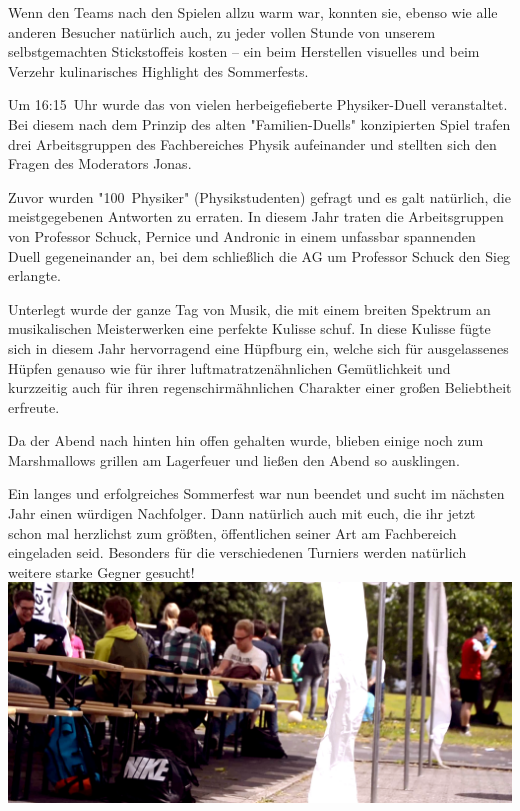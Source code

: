\begin{multicols*}{2}
Wenn den Teams nach den Spielen allzu warm war, konnten sie, ebenso wie alle anderen Besucher natürlich auch, zu jeder vollen Stunde von unserem selbstgemachten Stickstoffeis kosten -- ein beim Herstellen visuelles und beim Verzehr kulinarisches Highlight des Sommerfests. 

Um 16:15~Uhr wurde das von vielen herbeigefieberte Physiker-Duell veranstaltet.
Bei diesem nach dem Prinzip des alten "Familien-Duells" konzipierten Spiel trafen drei Arbeitsgruppen des Fachbereiches Physik aufeinander und stellten sich den Fragen des Moderators Jonas.

Zuvor wurden "100~Physiker" (Physikstudenten) gefragt und es galt natürlich, die meistgegebenen Antworten zu erraten.
In diesem Jahr traten die Arbeitsgruppen von Professor Schuck, Pernice und Andronic in einem unfassbar spannenden Duell gegeneinander an, bei dem schließlich die AG um Professor Schuck den Sieg erlangte.

Unterlegt wurde der ganze Tag von Musik, die mit einem breiten Spektrum an musikalischen Meisterwerken eine perfekte Kulisse schuf. In diese Kulisse fügte sich in diesem Jahr hervorragend eine Hüpfburg ein, welche sich für ausgelassenes Hüpfen genauso wie für ihrer luftmatratzenähnlichen Gemütlichkeit und kurzzeitig auch
für ihren regenschirmähnlichen Charakter einer großen Beliebtheit erfreute.

Da der Abend nach hinten hin offen gehalten wurde, blieben einige noch zum Marshmallows grillen am Lagerfeuer und ließen
den Abend so ausklingen.

Ein langes und erfolgreiches Sommerfest war nun beendet und sucht im nächsten Jahr einen würdigen Nachfolger.
Dann natürlich auch mit euch, die ihr jetzt schon mal herzlichst zum größten, öffentlichen seiner Art am Fachbereich eingeladen seid.
Besonders für die verschiedenen Turniers werden natürlich weitere starke Gegner gesucht!
\includegraphics[width=\columnwidth]{res/sommerfest_zelt_cropped}
\end{multicols*}

